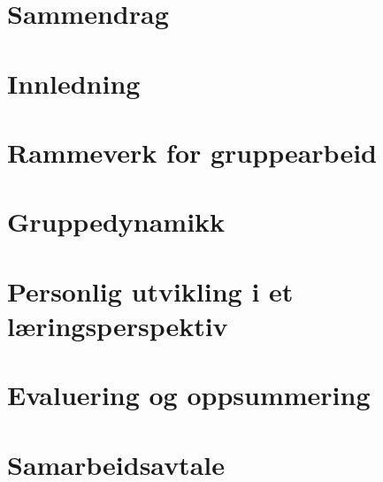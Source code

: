 \documentclass[11pt, a4paper]{report}
\begin{document}

\chapter{Sammendrag}

\tableofcontents
\chapter{Innledning}


\chapter{Rammeverk for gruppearbeid}


\chapter{Gruppedynamikk}


\chapter{Personlig utvikling i et læringsperspektiv}


\chapter{Evaluering og oppsummering}


\newpage
\appendix
{}
\chapter{Samarbeidsavtale}




\end{document}
